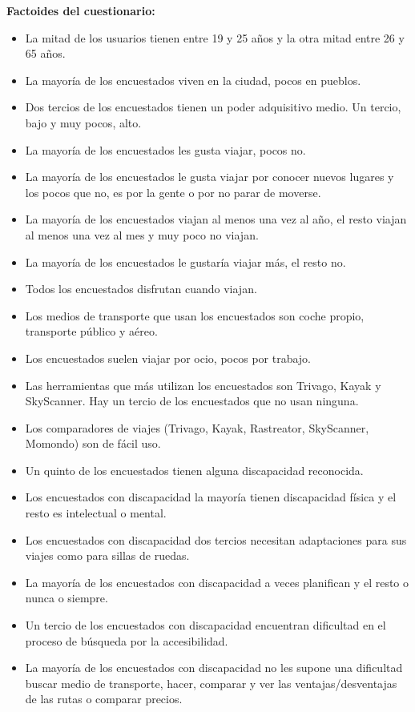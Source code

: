 \textbf{Factoides del cuestionario:}

\begin{itemize}
    \item La mitad de los usuarios tienen entre 19 y 25 años y la otra mitad entre 26 y 65 años.
    \item La mayoría de los encuestados viven en la ciudad, pocos en pueblos.
    \item Dos tercios de los encuestados tienen un poder adquisitivo medio. Un tercio, bajo y muy pocos, alto.
    \item La mayoría de los encuestados les gusta viajar, pocos no.
    \item La mayoría de los encuestados le gusta viajar por conocer nuevos lugares y los pocos que no, es por la gente o por no parar de moverse.
    \item La mayoría de los encuestados viajan al menos una vez al año, el resto viajan al menos una vez al mes y muy poco no viajan.
    \item La mayoría de los encuestados le gustaría viajar más, el resto no.
    \item Todos los encuestados disfrutan cuando viajan.
    \item Los medios de transporte que usan los encuestados son coche propio, transporte público y aéreo.
    \item Los encuestados suelen viajar por ocio, pocos por trabajo.
    \item Las herramientas que más utilizan los encuestados son Trivago, Kayak y SkyScanner. Hay un tercio de los encuestados que no usan ninguna.
    \item Los comparadores de viajes (Trivago, Kayak, Rastreator, SkyScanner, Momondo) son de fácil uso.
    \item Un quinto de los encuestados tienen alguna discapacidad reconocida.
    \item Los encuestados con discapacidad la mayoría tienen discapacidad física y el resto es intelectual o mental.
    \item Los encuestados con discapacidad dos tercios necesitan adaptaciones para sus viajes como para sillas de ruedas.
    \item La mayoría de los encuestados con discapacidad a veces planifican y el resto o nunca o siempre.
    \item Un tercio de los encuestados con discapacidad encuentran dificultad en el proceso de búsqueda por la accesibilidad.
    \item La mayoría de los encuestados con discapacidad no les supone una dificultad buscar medio de transporte, hacer, comparar y ver las ventajas/desventajas de las rutas o comparar precios.

\end{itemize}
